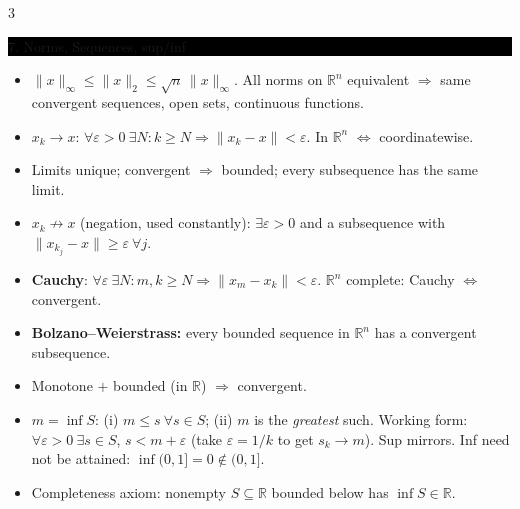 \documentclass[8pt,letterpaper]{article}
\makeatletter
\newcommand{\sect}[1]{%
  \vspace{2.2pt}%
  \noindent\colorbox{black}{\parbox{\dimexpr\linewidth-2\fboxsep}{%
    \color{white}\bfseries\scshape\fontsize{6.4}{7.4}\selectfont
    \hyphenpenalty=10000\exhyphenpenalty=10000\raggedright #1}}%
  \vspace{1.4pt}\par\nopagebreak\@afterheading}
\newenvironment{tl}
  {\begin{itemize}[leftmargin=6pt,itemsep=0.3pt,topsep=1pt,parsep=0pt,
                   partopsep=0pt,label=\textcolor{gray}{\tiny$\bullet$}]}
  {\end{itemize}}
\newcommand{\R}{\mathbb{R}}
\newcommand{\Rn}{\mathbb{R}^n}
\newcommand{\nm}[1]{\lVert #1\rVert}
\makeatother
\begin{document}
\begin{multicols}{3}
\sect{7. Norms, Sequences, sup/inf}
\begin{tl}
\item $\nm{x}_\infty\le\nm{x}_2\le\sqrt n\,\nm{x}_\infty$. All norms on $\Rn$ equivalent $\Rightarrow$ same convergent sequences, open sets, continuous functions.
\item \textbf{$x_k\to x$}: $\forall\varepsilon>0\ \exists N: k\ge N\Rightarrow\nm{x_k-x}<\varepsilon$. In $\Rn$ $\iff$ coordinatewise.
\item Limits unique; convergent $\Rightarrow$ bounded; every subsequence has the same limit.
\item \textbf{$x_k\not\to x$} (negation, used constantly): $\exists\varepsilon>0$ and a subsequence with $\nm{x_{k_j}-x}\ge\varepsilon\ \forall j$.
\item \textbf{Cauchy}: $\forall\varepsilon\ \exists N: m,k\ge N\Rightarrow\nm{x_m-x_k}<\varepsilon$. $\Rn$ complete: Cauchy $\iff$ convergent.
\item \textbf{Bolzano--Weierstrass:} every bounded sequence in $\Rn$ has a convergent subsequence.
\item Monotone $+$ bounded (in $\R$) $\Rightarrow$ convergent.
\item \textbf{$m=\inf S$}: (i) $m\le s\ \forall s\in S$; (ii) $m$ is the \emph{greatest} such. Working form: $\forall\varepsilon>0\ \exists s\in S$, $s<m+\varepsilon$ (take $\varepsilon=1/k$ to get $s_k\to m$). Sup mirrors. Inf need not be attained: $\inf(0,1]=0\notin(0,1]$.
\item Completeness axiom: nonempty $S\subseteq\R$ bounded below has $\inf S\in\R$.
\end{tl}


\end{multicols}
\end{document}
